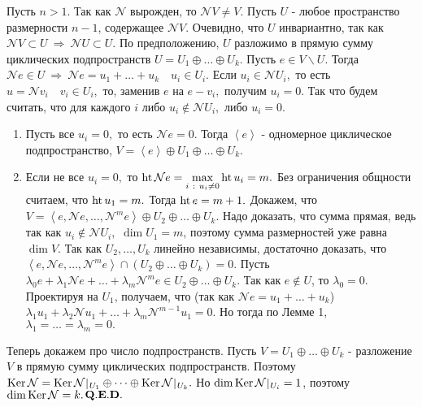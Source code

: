 \documentclass[a4paper]{article}%
\renewcommand{\ab}{\par\noindent}%
\newcommand{\qed}{\quad${{\bf Q.E.D.}}$}
\newcommand{\lob}[1]{\left\langle#1\right\rangle}%
\newcommand{\ps}{\oplus}
\newcommand{\rom}[1]{{\rm#1\,}}
\newcommand{\op}[1]{$\mathcal{#1}$}
\renewcommand{\om}[1]{\mathcal{#1}}
\begin{document}
\ab Пусть $n>1$. Так как \op{N} вырожден, то $\om{N}V\ne V.$ Пусть $U$ - любое пространство размерности $n-1$,
содержащее $\om{N}V.$ Очевидно, что $U$ инвариантно, так как $\om{N}V\subset U\ \Rightarrow\ \om{N}U\subset U.$ %
По предположению, $U$ разложимо в прямую сумму циклических подпространств $U=U_1\ps\dots\ps U_k.$ Пусть $e\in
V\backslash U.$ Тогда $\om{N}e\in U\ \Rightarrow\ \om{N}e=u_1+\dots+u_k\quad u_i\in U_i.$ Если $u_i\in\om{N}U_i,$
то есть $u=\om{N}v_i\quad v_i\in U_i,$ то, заменив $e$ на $e-v_i,$ получим $u_i=0.$ Так что будем считать, что
для каждого $i$ либо $u_i\notin\om{N}U_i,$ либо $u_i=0.$
\begin{enumerate}
    \item Пусть все $u_i=0,$ то есть $\om{N}e=0.$ Тогда $\lob{e}$ - одномерное циклическое подпространство, $V=\lob{e}\ps U_1
    \ps\dots\ps U_k.$
    \item Если не все $u_i=0,$ то $\rom{ht}\om{N}e=\max\limits_{i\ :\ u_i\ne 0}\rom{ht}u_i=m.$ Без ограничения
    общности считаем, что $\rom{ht}u_1=m.$ Тогда $\rom{ht}e=m+1.$ Докажем, что $V=\lob{e,\om{N}e,\dots,\om{N}^me}\ps U_2\ps\dots\ps U_k.$
    Надо доказать, что сумма прямая, ведь так как $u_i\notin\om{N}U_i,$ $\dim U_1=m$, поэтому сумма размерностей
    уже равна $\dim V.$ Так как $U_2,\dots,U_k$ линейно независимы, достаточно доказать, что\\ $\lob{e,\om{N}e,\dots,\om{N}^me}\cap(U_2\ps\dots\ps U_k)=0.$
    Пусть $\lambda_0e+\lambda_1\om{N}e+\dots+\lambda_m\om{N}^me\in U_2\ps\dots\ps U_k.$ Так как $e\notin U$, то $\lambda_0=0.$
    Проектируя на $U_1$, получаем, что (так как $\om{N}e=u_1+\dots+u_k$) $\lambda_1u_1+\lambda_2\om{N}u_1+\dots+\lambda_m\om{N}^{m-1}u_1=0.$
    Но тогда по Лемме 1, $\lambda_1=\dots=\lambda_m=0.$
\end{enumerate}
\ab Теперь докажем про число подпространств. Пусть $V=U_1\ps\dots\ps U_k$ - разложение $V$ в прямую сумму
циклических подпространств. Поэтому
$\rom{Ker}\om{N}=\rom{Ker}\om{N}\,\vrule\,_{U_1}\ps\dots\ps\rom{Ker}\om{N}\,\vrule\,_{U_k}.$ Но
$\dim\rom{Ker}\om{N}\,\vrule\,_{U_i}=1$, поэтому $\dim\rom{Ker}\om{N}=k.$\qed
\end{document}

